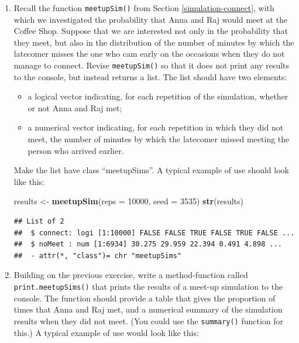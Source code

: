 \documentclass[]{book}
\makeatletter
\newenvironment{Shaded}{\begin{snugshade}}{\end{snugshade}}
\newcommand{\KeywordTok}[1]{\textcolor[rgb]{0.13,0.29,0.53}{\textbf{#1}}}
\newcommand{\DataTypeTok}[1]{\textcolor[rgb]{0.13,0.29,0.53}{#1}}
\newcommand{\DecValTok}[1]{\textcolor[rgb]{0.00,0.00,0.81}{#1}}
\newcommand{\StringTok}[1]{\textcolor[rgb]{0.31,0.60,0.02}{#1}}
\newcommand{\NormalTok}[1]{#1}
\providecommand{\tightlist}{%
  \setlength{\itemsep}{0pt}\setlength{\parskip}{0pt}}
\newenvironment{kframe}{%
\medskip{}
\setlength{\fboxsep}{.8em}
 \def\at@end@of@kframe{}%
 \ifinner\ifhmode%
  \def\at@end@of@kframe{\end{minipage}}%
  \begin{minipage}{\columnwidth}%
 \fi\fi%
 \def\FrameCommand##1{\hskip\@totalleftmargin \hskip-\fboxsep
 \colorbox{shadecolor}{##1}\hskip-\fboxsep
     \hskip-\linewidth \hskip-\@totalleftmargin \hskip\columnwidth}%
 \MakeFramed {\advance\hsize-\width
   \@totalleftmargin\z@ \linewidth\hsize
   \@setminipage}}%
 {\par\unskip\endMakeFramed%
 \at@end@of@kframe}
\renewenvironment{Shaded}{\begin{kframe}}{\end{kframe}}
\theoremstyle{definition}
\theoremstyle{definition}
\theoremstyle{definition}
\theoremstyle{remark}
\makeatother
\begin{document}
{\begin{enumerate}
  Run a simulation, initializing the ocean with ten whales of each sex.
  Their specific characteristics are up to you, as is the value of the
  starvation parameter. Write an R Markdown document that incorporates
  the appropriate code and includes a discussion of your results.
\item
  Recall the function \texttt{meetupSim()} from Section
  \ref{simulation-connect}, with which we investigated the probability
  that Anna and Raj would meet at the Coffee Shop. Suppose that we are
  interested not only in the probability that they meet, but also in the
  distribution of the number of minutes by which the latecomer misses
  the one who cam early on the occasions when they do not manage to
  connect. Revise \texttt{meetupSim()} so that it does not print any
  results to the console, but instead returns a list. The list should
  have two elements:

  \begin{itemize}
  \tightlist
  \item
    a logical vector indicating, for each repetition of the simulation,
    whether or not Anna and Raj met;
  \item
    a numerical vector indicating, for each repetition in which they did
    not meet, the number of minutes by which the latecomer missed
    meeting the person who arrived earlier.
  \end{itemize}

  Make the list have class ``meetupSims''. A typical example of use
  should look like this:

\begin{Shaded}
\begin{Highlighting}[]
\NormalTok{results <-}\StringTok{ }\KeywordTok{meetupSim}\NormalTok{(}\DataTypeTok{reps =} \DecValTok{10000}\NormalTok{, }\DataTypeTok{seed =} \DecValTok{3535}\NormalTok{)}
\KeywordTok{str}\NormalTok{(results)}
\end{Highlighting}
\end{Shaded}

\begin{verbatim}
## List of 2
##  $ connect: logi [1:10000] FALSE FALSE TRUE FALSE TRUE FALSE ...
##  $ noMeet : num [1:6934] 30.275 29.959 22.394 0.491 4.898 ...
##  - attr(*, "class")= chr "meetupSims"
\end{verbatim}
\item
  Building on the previous exercise, write a method-function called
  \texttt{print.meetupSims()} that prints the results of a meet-up
  simulation to the console. The function should provide a table that
  gives the proportion of times that Anna and Raj met, and a numerical
  summary of the simulation results when they did not meet. (You could
  use the \texttt{summary()} function for this.) A typical example of
  use would look like this:


\end{enumerate}}
\end{document}
